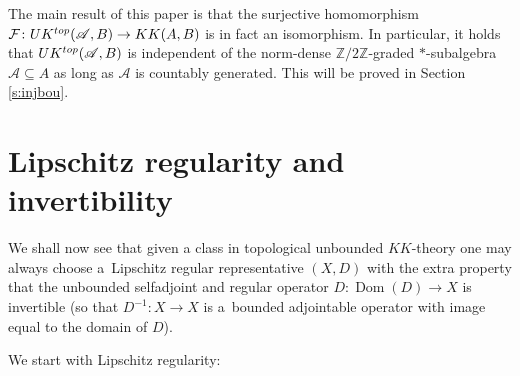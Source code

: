 \documentclass[11pt]{article}
\numberwithin{equation}{section}
\newcommand{\zz}{\mathbb{Z}}
\newcommand{\C}[1]{\mathcal{#1}}
\newcommand{\s}[1]{\mathscr{#1}}
\newcommand{\su}{\subseteq}
\begin{document}
The main result of this paper is that the surjective homomorphism $\C F\colon UK^{{\rm top}}(\s A,B) \to KK(A,B)$ is in fact an isomorphism. In particular, it holds that $UK^{{\rm top}}(\s A,B)$ is independent of the norm-dense $\zz/2\zz$-graded $*$-subalgebra $\s A \su A$ as long as $\s A$ is countably generated. This will be proved in Section \ref{s:injbou}.



\section{Lipschitz regularity and invertibility}
We shall now see that given a class in topological unbounded $KK$-theory one may always choose a~Lipschitz regular representative $(X,D)$ with the extra property that the unbounded selfadjoint and regular operator $D\colon \operatorname{Dom}(D) \to X$ is invertible (so that $D^{-1}\colon X \to X$ is a~bounded adjointable operator with image equal to the domain of $D$).

We start with Lipschitz regularity:
\end{document}
